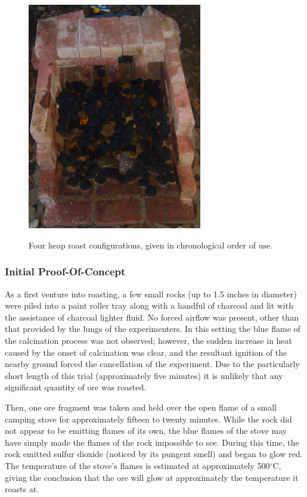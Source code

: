 \begin{figure}[htb]
{\includegraphics[width=3in]{images/2012.07.05_fourth_heap_roast/fourth_roast_setup.jpg}
}

\caption{Four heap roast configurations, given in chronological order of use.}
\label{fig:heaproast}
\end{figure}

\subsubsection{Initial Proof-Of-Concept}

As a first venture into roasting, a few small rocks (up to 1.5 inches in
diameter) were piled into a paint roller tray along with a handful of charcoal
and lit with the assistance of charcoal lighter fluid.  No forced airflow was
present, other than that provided by the lungs of the experimenters.  In this
setting the blue flame of the calcination process was not observed; however, the
sudden increase in heat caused by the onset of calcination was clear, and the
resultant ignition of the nearby ground forced the cancellation of the
experiment.  Due to the particularly short length of this trial (approximately
five minutes) it is unlikely that any significant quantity of ore was roasted.

Then, one ore fragment was taken and held over the open flame of a small camping
stove for approximately fifteen to twenty minutes.  While the rock did not
appear to be emitting flames of its own, the blue flames of the stove may have
simply made the flames of the rock impossible to see.  During this time, the
rock emitted sulfur dioxide (noticed by its pungent smell) and began to glow
red.  The temperature of the stove's flames is estimated at approximately
500$^\circ$C, giving the conclusion that the ore will glow at approximately the
temperature it roasts at.

